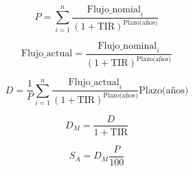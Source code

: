 \documentclass[10pt,a4paper]{article}
\begin{document}
	\[ P = \sum_{i=1}^{n} \dfrac{\text{Flujo\_nomial}_i}{(1+\text{TIR})^\text{Plazo(años)}} \]
	
	\[ \text{Flujo\_actual} = \dfrac{\text{Flujo\_nominal}_i}{(1+\text{TIR})^\text{Plazo(años)}} \]
	
	\[ D = \dfrac{1}{P} \sum_{i=1}^{n} \dfrac{\text{Flujo\_actual}_i}{(1+\text{TIR})^\text{Plazo(años)}} \text{Plazo(años)} \]
	
	\[ D_M = \dfrac{D}{1 + \text{TIR}} \]
	
	\[ S_A = D_M \dfrac{P}{100} \]
\end{document}
